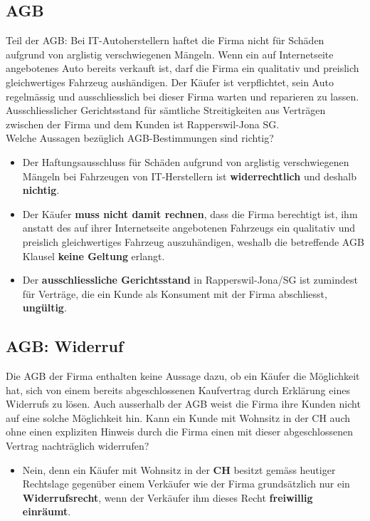 \subsection{AGB}
Teil der AGB: Bei IT-Autoherstellern haftet die Firma nicht für Schäden aufgrund von arglistig verschwiegenen Mängeln. Wenn ein auf Internetseite angebotenes Auto bereits verkauft ist, darf die Firma ein qualitativ und preislich gleichwertiges Fahrzeug aushändigen. Der Käufer ist verpflichtet, sein Auto regelmässig und ausschliesslich bei dieser Firma warten und reparieren zu lassen. Ausschliesslicher Gerichtsstand für sämtliche Streitigkeiten aus Verträgen zwischen der Firma und dem Kunden ist Rapperswil-Jona SG.\\
Welche Aussagen bezüglich AGB-Bestimmungen sind richtig?
\begin{itemize}
	\item Der Haftungsausschluss für Schäden aufgrund von arglistig verschwiegenen Mängeln bei Fahrzeugen von IT-Herstellern ist \textbf{widerrechtlich} und deshalb \textbf{nichtig}.
	\item Der Käufer \textbf{muss nicht damit rechnen}, dass die Firma berechtigt ist, ihm anstatt des auf ihrer Internetseite angebotenen Fahrzeugs ein qualitativ und preislich gleichwertiges Fahrzeug auszuhändigen, weshalb die	betreffende AGB Klausel \textbf{keine Geltung} erlangt.
	\item Der \textbf{ausschliessliche Gerichtsstand} in Rapperswil-Jona/SG ist zumindest für Verträge, die ein Kunde als Konsument mit der Firma abschliesst, \textbf{ungültig}.
\end{itemize}

\subsection{AGB: Widerruf}
Die AGB der Firma enthalten keine Aussage dazu, ob ein Käufer die Möglichkeit hat, sich von einem bereits abgeschlossenen Kaufvertrag durch Erklärung eines Widerrufs zu lösen. Auch ausserhalb der AGB weist die Firma ihre Kunden nicht auf eine solche Möglichkeit hin. Kann ein Kunde mit Wohnsitz in der CH auch ohne einen expliziten Hinweis durch die Firma einen mit dieser abgeschlossenen Vertrag nachträglich widerrufen?
\begin{itemize}
	\item Nein, denn ein Käufer mit Wohnsitz in der \textbf{CH} besitzt gemäss heutiger Rechtslage gegenüber einem Verkäufer wie der Firma grundsätzlich nur ein \textbf{Widerrufsrecht}, wenn der Verkäufer ihm dieses Recht \textbf{freiwillig einräumt}.
\end{itemize}

